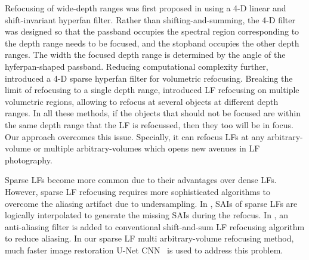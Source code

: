 
Refocusing of wide-depth ranges was first proposed in \cite{volumetric} using a 4-D linear and shift-invariant hyperfan filter. Rather than shifting-and-summing, the 4-D filter was designed so that the passband occupies the spectral region corresponding to the depth range needs to be focused, and the stopband occupies the other depth ranges. The width the focused depth range is determined by the angle of the hyferpan-shaped passband. Reducing computational complexity further, \cite{volumeSparseFIR} introduced a 4-D sparse hyperfan filter for volumetric refocusing. Breaking the limit of refocusing to a single depth range, \cite{multivolume} introduced LF refocusing on multiple volumetric regions, allowing to refocus at several objects at different depth ranges. In all these methods, if the objects that should not be focused are within the same depth range that the LF is refocussed, then they too will be in focus. Our approach  overcomes this issue. Specially, it can refocus LFs at any arbitrary-volume or multiple arbitrary-volumes which opens new avenues in LF photography. 


Sparse LFs become more common due to their advantages over dense LFs.
However, sparse LF refocusing requires more sophisticated algorithms to overcome the aliasing artifact due to undersampling. In \cite{2015fast_real}, SAIs of sparse LFs are logically interpolated to generate the missing SAIs during the refocus. In \cite{alain2021spatio_sparse}, an anti-aliasing filter is added to conventional shift-and-sum LF refocusing algorithm to reduce aliasing. In our sparse LF multi arbitrary-volume refocusing method, much faster image restoration U-Net CNN~\cite{unet} is used to address this problem.

